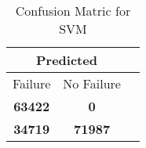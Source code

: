 \begin{table}[] 
\caption{Confusion Matric for SVM} 
\label{Table: Prediction Accuracy-NoneSVMRandomForest100EKF-ignoresolarPanelDipole-solarPanelDipole} 
\centering 
\begin{tabular} 
 {@{}ccc@{}} 
\toprule 
\multicolumn{2}{c}{\textbf{Predicted}}
 \\ \midrule 
\multicolumn{1}{|c|}{Failure} & 
\multicolumn{1}{c|}{No Failure}
 \\ \midrule 
\multicolumn{1}{|c|}{\color{green}\textbf{63422}} & 
\multicolumn{1}{c|}{\color{red}\textbf{0}}
 \\ \midrule 
\multicolumn{1}{|c|}{\color{red}\textbf{34719}} & 
\multicolumn{1}{c|}{\color{green}\textbf{71987}}
 \\ \bottomrule 
\end{tabular} 
\end{table} 
